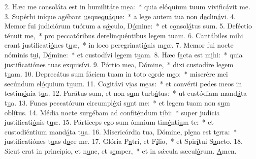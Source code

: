 2. Hæc me consoláta est in humilit\uline{á}te m\uline{e}a:~* quia elóquium tuum viv\uline{i}fic\uline{á}vit me.
3. Supérbi iníque agébant \uline{u}sque\uline{quá}que:~* a lege autem tua non d\uline{e}clin\uline{á}vi.
4. Memor fui judiciórum tuórum a s\uline{ǽ}culo, D\uline{ó}mine:~* et c\uline{o}nsol\uline{á}tus sum.
5. Deféctio t\uline{é}nu\uline{i}t me,~* pro peccatóribus derelinquéntibus l\uline{e}gem t\uline{u}am.
6. Cantábiles mihi erant justificati\uline{ó}nes t\uline{u}æ,~* in loco peregrinati\uline{ó}nis m\uline{e}æ.
7. Memor fui nocte nóminis t\uline{u}i, D\uline{ó}mine:~* et custodívi l\uline{e}gem t\uline{u}am.
8. Hæc f\uline{a}cta est m\uline{i}hi:~* quia justificatiónes tuas \uline{e}xquis\uline{í}vi.
9. Pórtio m\uline{e}a, D\uline{ó}mine,~* dixi custodíre l\uline{e}gem t\uline{u}am.
10. Deprecátus sum fáciem tuam in toto c\uline{o}rde m\uline{e}o:~* miserére mei secúndum el\uline{ó}quium t\uline{u}um.
11. Cogitávi v\uline{i}as m\uline{e}as:~* et convérti pedes meos in testim\uline{ó}nia t\uline{u}a.
12. Parátus sum, et non s\uline{u}m turb\uline{á}tus:~* ut custódiam mand\uline{á}ta t\uline{u}a.
13. Funes peccatórum circumpl\uline{é}xi s\uline{u}nt me:~* et legem tuam non s\uline{u}m obl\uline{í}tus.
14. Média nocte surgébam ad confit\uline{é}ndum t\uline{i}bi:~* super judícia justificati\uline{ó}nis t\uline{u}æ.
15. Párticeps ego sum ómnium tim\uline{é}nti\uline{u}m te:~* et custodiéntium mand\uline{á}ta t\uline{u}a.
16. Misericórdia tua, Dómine, pl\uline{e}na est t\uline{e}rra:~* justificatiónes t\uline{u}as d\uline{o}ce me.
17. Glória P\uline{a}tri, et F\uline{í}lio,~* et Spir\uline{í}tui S\uline{a}ncto.
18. Sicut erat in princípio, et n\uline{u}nc, et s\uline{e}mper,~* et in sǽcula sæcul\uline{ó}rum. \uline{A}men.
